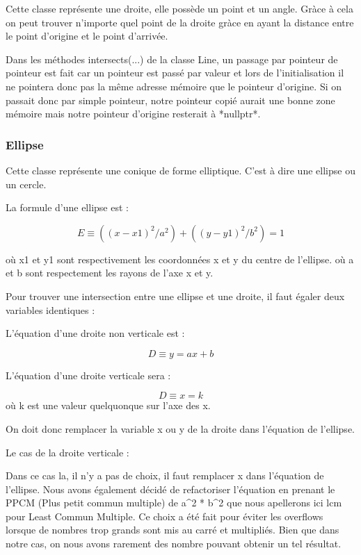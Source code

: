 \documentclass[]{article}
\begin{document}
Cette classe représente une droite, elle possède un point et un
angle. Gràce à cela on peut trouver n'importe quel point de la 
droite gràce en ayant la distance entre le point d'origine
et le point d'arrivée.

Dans les méthodes intersects(...) de la classe Line, un passage
par pointeur de pointeur est fait car un pointeur est passé par 
valeur et lors de l'initialisation il ne pointera donc pas la même
adresse mémoire que le pointeur d'origine.
Si on passait donc par simple pointeur, notre pointeur copié
aurait une bonne zone mémoire mais notre pointeur d'origine
resterait à *nullptr*.

\subsubsection{Ellipse}


Cette classe représente une conique de forme elliptique.
C'est à dire une ellipse ou un cercle.

La formule d'une ellipse est : 

$$ E \equiv ((x - x1)^2 / a^2) + ((y - y1)^2 / b^2) = 1 $$

où x1 et y1 sont respectivement les coordonnées
x et y du centre de l'ellipse.
où a et b sont respectement les rayons de l'axe
x et y.

Pour trouver une intersection entre une ellipse
et une droite, il faut égaler deux variables 
identiques :

L'équation d'une droite non verticale est : 

    $$D \equiv y = ax + b$$

L'équation d'une droite verticale sera : 

    $$D \equiv x = k$$
        où k est une valeur quelquonque sur l'axe des x.

On doit donc remplacer la variable x ou y de la droite dans
l'équation de l'ellipse.

Le cas de la droite verticale : 

Dans ce cas la, il n'y a pas de choix, il faut remplacer
x dans l'équation de l'ellipse.
Nous avons également décidé de refactoriser l'équation en 
prenant le PPCM (Plus petit commun multiple) de a^2 * b^2 que
nous apellerons ici lcm pour Least Commun Multiple.
Ce choix a été fait pour éviter les overflows lorsque 
de nombres trop grands sont mis au carré et multipliés.
Bien que dans notre cas, on nous avons rarement des nombre
pouvant obtenir un tel résultat.
\end{document}
